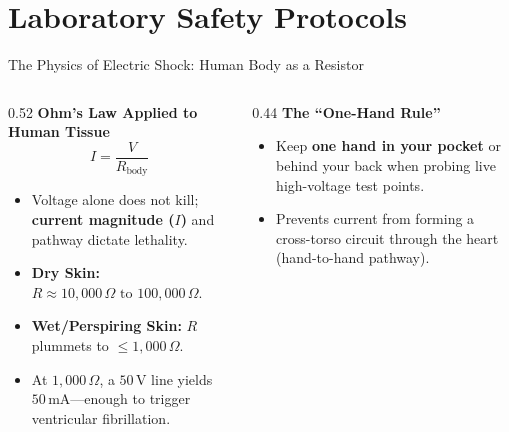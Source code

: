
\section{Laboratory Safety Protocols}

\begin{frame}{The Physics of Electric Shock: Human Body as a Resistor}
    \begin{columns}[T]
        \begin{column}{0.52\textwidth}
            \textbf{Ohm's Law Applied to Human Tissue}
            $$I = \frac{V}{R_{\text{body}}}$$
            \begin{itemize}
                \item Voltage alone does not kill; \textbf{current magnitude ($I$)} and pathway dictate lethality.
                \item \textbf{Dry Skin:} $R \approx 10{,}000\,\Omega \text{ to } 100{,}000\,\Omega$.
                \item \textbf{Wet/Perspiring Skin:} $R$ plummets to $\le 1{,}000\,\Omega$.
                \item At $1{,}000\,\Omega$, a $50\,\text{V}$ line yields $50\,\text{mA}$---enough to trigger ventricular fibrillation.
            \end{itemize}
        \end{column}
        \begin{column}{0.44\textwidth}
            \textbf{The ``One-Hand Rule''}
            \begin{itemize}
                \item Keep \textbf{one hand in your pocket} or behind your back when probing live high-voltage test points.
                \item Prevents current from forming a cross-torso circuit through the heart (hand-to-hand pathway).
            \end{itemize}
        \end{column}
    \end{columns}
\end{frame}

